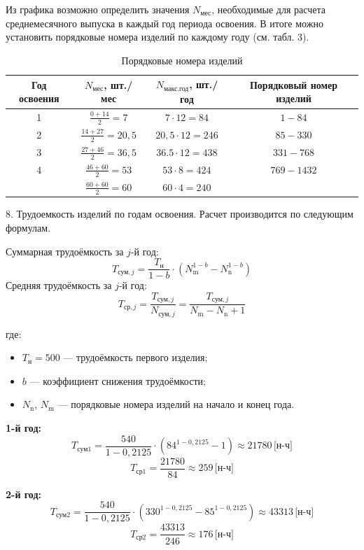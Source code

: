 Из графика возможно определить значения $N_{\text{мес}}$, необходимые для
расчета среднемесячного выпуска в каждый год периода освоения. В итоге можно
установить порядковые номера изделий по каждому году (см. табл. 3).

\begin{table}
\caption{Порядковые номера изделий}
\begin{tabularx}{\textwidth}{|c|c|c|c|} \hline
Год освоения & $N_{\text{мес}}$, шт./мес & $N_{\text{макс.год}}$, шт./год & Порядковый номер изделий \\ \hline
1            & $\frac{0 + 14}{2} = 7$ & $7 \cdot 12 = 84$ & $1 - 84$ \\ \hline
2            & $\frac{14 + 27}{2} = 20,5$ & $20,5 \cdot 12 = 246$ & $85 - 330$ \\ \hline
3            & $\frac{27 + 46}{2} = 36,5$ & $36.5 \cdot 12 = 438$ & $331 - 768$ \\ \hline
4            & $\frac{46 + 60}{2} = 53$ & $53 \cdot 8 = 424$ & $769 - 1432$ \\ \hhline{~--~}
             & $\frac{60 + 60}{2} = 60$ & $60 \cdot 4 = 240$ &  \\ \hline
\end{tabularx}
\label{tab:tab1}
\end{table}

8. Трудоемкость изделий по годам освоения. Расчет производится по следующим формулам.

Суммарная трудоёмкость за $j$-й год:
\[
T_{\text{сум},j} = \frac{T_{\text{н}}}{1-b} \cdot \left( N_{\text{m}}^{1-b} - N_{\text{n}}^{1-b} \right)
\]
Средняя трудоёмкость за $j$-й год:
\[
T_{\text{ср},j} = \frac{T_{\text{сум},j}}{N_{\text{сум},j}} = \frac{T_{\text{сум},j}}{N_{\text{m}} - N_{\text{n}} + 1}
\]

\noindent где:
\begin{itemize}
    \item $T_{\text{н}} = 500$ — трудоёмкость первого изделия;
    \item $b$ — коэффициент снижения трудоёмкости;
    \item $N_{\text{n}}$, $N_{\text{m}}$ — порядковые номера изделий на начало и конец года.
\end{itemize}

\textbf{1-й год:}
\[
T_{\text{сум}1} = \frac{540}{1 - 0,2125} \cdot (84^{1 - 0,2125} - 1) \approx 21780 \, \text{[н-ч]}
\]
\[
T_{\text{ср}1} = \frac{21780}{84} \approx 259 \, \text{[н-ч]}
\]

\vspace{0.5cm}
\textbf{2-й год:}
\[
T_{\text{сум}2} = \frac{540}{1 - 0,2125} \cdot (330^{1 - 0,2125} - 85^{1 - 0,2125}) \approx 43313 \, \text{[н-ч]}
\]
\[
T_{\text{ср}2} = \frac{43313}{246} \approx 176 \, \text{[н-ч]}
\]

